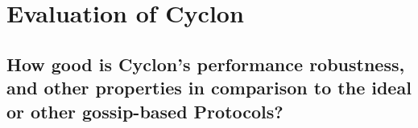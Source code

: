 \chapter{Evaluation of Cyclon} 
\label{chap:evaluation}

\section{How good is Cyclon's performance robustness, and other properties in
comparison to the ideal or other gossip-based Protocols?}
